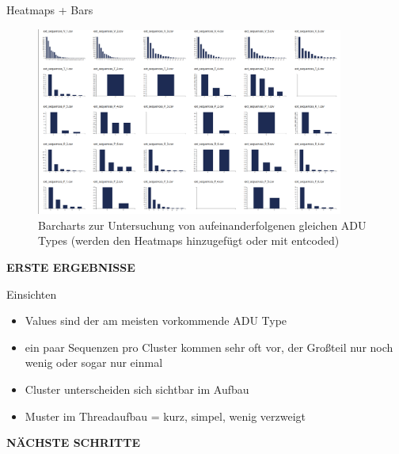 \documentclass[compress,12pt]{beamer}
\begin{document}
    \begin{frame}{Heatmaps + Bars}
        \begin{figure}
            \centering
            \includegraphics[width=0.9\textwidth]{../images/heatmap-bars-example}
            \caption{Barcharts zur Untersuchung von aufeinanderfolgenen gleichen ADU Types (werden den Heatmaps hinzugefügt oder mit entcoded)}
            \label{fig:heatmap-bars-example}
        \end{figure}
    \end{frame}

    \End

    \begin{frame}
        \centering
        \textbf{ERSTE ERGEBNISSE}
    \end{frame}


    \begin{frame}{Einsichten}
        \begin{itemize}
            \item Values sind der am meisten vorkommende ADU Type
            \item ein paar Sequenzen pro Cluster kommen sehr oft vor, der Großteil nur noch wenig oder sogar nur einmal
            \item Cluster unterscheiden sich sichtbar im Aufbau
            \item Muster im Threadaufbau = kurz, simpel, wenig verzweigt
        \end{itemize}
    \end{frame}
    \End

    \begin{frame}
        \centering
        \textbf{NÄCHSTE SCHRITTE}
    \end{frame}
\end{document}
